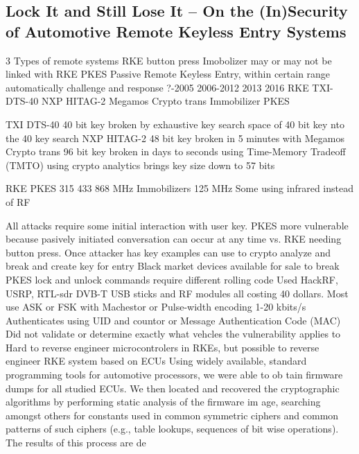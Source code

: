 \documentclass[conference]{journal}
\begin{document}
\subsection{Lock It and Still Lose It – On the (In)Security of Automotive Remote Keyless Entry Systems \cite{garcia_lock_2016}}
			
3 Types of remote systems							
RKE	button press						
Imobolizer	may or may not be linked with RKE						
PKES	Passive Remote Keyless Entry, within certain range automatically challenge and response						
	?-2005	2006-2012	2013	2016			
RKE	TXI-DTS-40	NXP HITAG-2	Megamos Crypto trans				
Immobilizer							
PKES							
							
TXI DTS-40	40 bit key	broken by exhaustive key search space of 40 bit key nto the 40 key search					
NXP HITAG-2	48 bit key broken in 5 minutes with 						
Megamos Crypto trans	96 bit key broken in days to seconds using Time-Memory Tradeoff (TMTO) using crypto analytics brings key size down to 57 bits						
							
RKE	PKES	315	433	868	MHz		
Immobilizers		125	MHz				
Some using infrared instead of RF							
							
All attacks require some initial interaction with user key. PKES more vulnerable because pasively initiated conversation can occur at any time vs. RKE needing button press. Once attacker has key examples can use to crypto analyze and break and create key for entry							
Black market devices available for sale to break PKES							
lock and unlock commands require different rolling code							
Used HackRF, USRP, RTL-sdr DVB-T USB sticks and RF modules all costing 40 dollars.							
Most use ASK or FSK with Machestor or Pulse-width encoding 1-20 kbits/s							
Authenticates using UID and countor or Message Authentication Code (MAC)							
Did not validate or determine exactly what vehcles the vulnerability applies to							
Hard to reverse engineer microcontrolers in RKEs, but possible to reverse engineer RKE system based on ECUs							
Using widely available, standard programming							
tools for automotive processors, we were able to ob							
tain firmware dumps for all studied ECUs. We then							
located and recovered the cryptographic algorithms							
by performing static analysis of the firmware im							
age, searching amongst others for constants used in							
common symmetric ciphers and common patterns							
of such ciphers (e.g., table lookups, sequences of bit							
wise operations). The results of this process are de							
							
\end{document}

